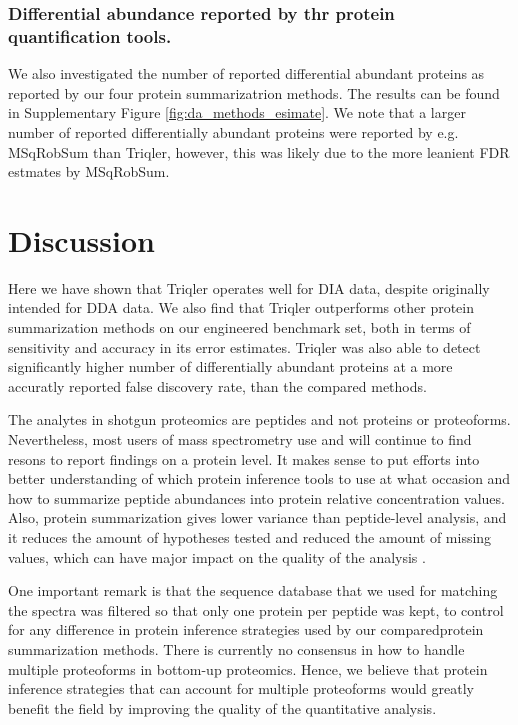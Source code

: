 \documentclass[10pt,letterpaper]{article}
\begin{document}
\subsubsection*{Differential abundance reported by thr protein quantification tools.}

We also investigated the number of reported differential abundant proteins as reported by our four protein summarizatrion methods. The results can be found in Supplementary Figure \ref{fig:da_methods_esimate}. We note that a larger number of reported differentially abundant proteins were reported by e.g. MSqRobSum than Triqler, however, this was likely due to the more leanient FDR estmates by MSqRobSum.



\section*{Discussion}


Here we have shown that Triqler operates well for DIA data, despite originally intended for DDA data. We also find that Triqler outperforms other protein summarization methods on our engineered benchmark set, both in terms of sensitivity and accuracy in its error estimates. Triqler was also able to detect significantly higher number of differentially abundant proteins at a more accuratly reported false discovery rate, than the compared methods. 

The analytes in shotgun proteomics are peptides and not proteins or proteoforms. Nevertheless, most users of mass spectrometry use and will continue to find resons to report findings on a protein level. It makes sense to put efforts into better understanding of which protein inference tools to use at what occasion and how to summarize peptide abundances into protein relative concentration values.  Also, protein summarization gives lower variance than peptide-level analysis, and it reduces the amount of hypotheses tested and reduced the amount of missing values, which can have major impact on the quality of the analysis \cite{plubell2021can}.   

One important remark is that the sequence database that we used for matching the spectra was filtered so that only one protein per peptide was kept, to control for any difference in protein inference strategies used by our comparedprotein summarization methods. There is currently no consensus in how to handle multiple proteoforms in bottom-up proteomics. Hence, we believe that protein inference strategies that can account for multiple proteoforms would greatly benefit the field by improving the quality of the quantitative analysis. 
\end{document}
